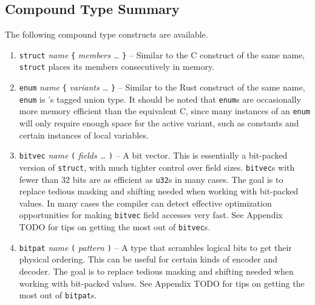 \subsection{Compound Type Summary}

The following compound type constructs are available.

\begin{enumerate}

\item {\tt struct} {\em name} {\tt \{} {\em members \dots} {\tt \}}
-- Similar to the C construct of the same name, {\tt struct} places its
members consecutively in memory.

\item {\tt enum} {\em name} {\tt \{} {\em variants \dots} {\tt \}} --
Similar to the Rust construct of the same name, {\tt enum} is \gx{}'s
tagged union type. It should be noted that {\tt enum}s are occasionally
more memory efficient than the equivalent C, since many instances of
an {\tt enum} will only require enough space for the active variant,
such as constants and certain instances of local variables.

\item {\tt bitvec} {\em name} {\tt (} {\em fields \dots} {\tt )} -- A
bit vector. This is essentially a bit-packed version of {\tt struct},
with much tighter control over field sizes. {\tt bitvec}s with fewer
than 32 bits are as efficient as {\tt u32}s in many cases. The goal is to
replace tedious masking and shifting needed when working with bit-packed
values. In many cases the compiler can detect effective optimization
opportunities for making {\tt bitvec} field accesses very fast. See
Appendix TODO for tips on getting the most out of {\tt bitvec}s.

\item {\tt bitpat} {\em name} {\tt (} {\em pattern} {\tt )} -- A type that
scrambles logical bits to get their physical ordering. This can be useful
for certain kinds of encoder and decoder. The goal is to replace tedious
masking and shifting needed when working with bit-packed values. See
Appendix TODO for tips on getting the most out of {\tt bitpat}s.

\end{enumerate}
